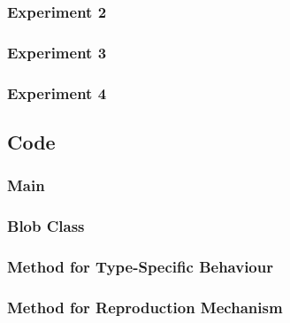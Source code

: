 \documentclass[sigconf]{acmart}
\begin{document}
    \subsubsection*{Experiment 2}
    

    \subsubsection*{Experiment 3}
    

    \subsubsection*{Experiment 4}
    

    \subsection{Code}\label{sec:code}
    \subsubsection*{Main}
    

    \subsubsection*{Blob Class}
    

    \subsubsection*{Method for Type-Specific Behaviour}
    

    \subsubsection*{Method for Reproduction Mechanism}
    
\end{document}
